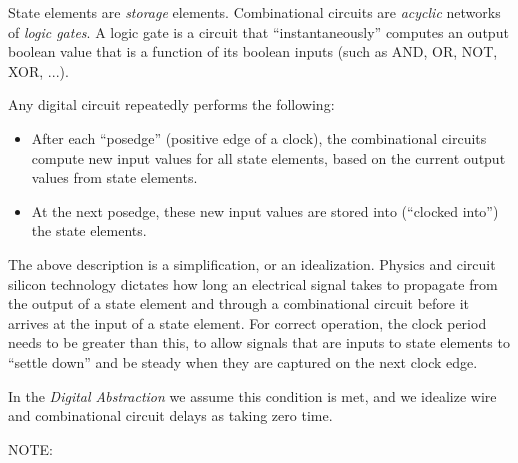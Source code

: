 State elements are \emph{storage} elements.  Combinational circuits
are \emph{acyclic} networks of \emph{logic gates}.  A logic gate is a
circuit that ``instantaneously'' computes an output boolean value that
is a function of its boolean inputs (such as AND, OR, NOT, XOR, ...).

Any digital circuit repeatedly performs the following:

\begin{itemize}

\item After each ``posedge'' (positive edge of a clock), the
      combinational circuits compute new input values for all state
      elements, based on the current output values from state elements.

\item At the next posedge, these new input values are stored into
      (``clocked into'') the state elements.

\end{itemize}

The above description is a simplification, or an idealization.
Physics and circuit silicon technology dictates how long an electrical
signal takes to propagate from the output of a state element and
through a combinational circuit before it arrives at the input of a
state element.  For correct operation, the clock period needs to be
greater than this, to allow signals that are inputs to state elements
to ``settle down'' and be steady when they are captured on the next
clock edge.


In the \emph{Digital Abstraction} we assume this condition is met, and
we idealize wire and combinational circuit delays as taking zero time.


\vspace{1ex}

NOTE: 

